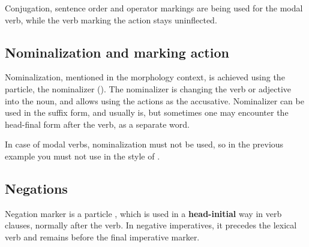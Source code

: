 Conjugation, sentence order and operator markings are being used for the modal
verb, while the verb marking the action stays uninflected.



\subsection{Nominalization and marking action}

Nominalization, mentioned in the morphology context, is achieved using the
 particle, the nominalizer (\Nmlz{}). The nominalizer is changing the
verb or adjective into the noun, and allows using the actions as the accusative.
Nominalizer can be used in the suffix form, and usually is, but sometimes one
may encounter the head-final form after the verb, as a separate word.



In case of modal verbs, nominalization must not be used, so in the previous
example  you must not use  in
the style of .

\subsection{Negations}

Negation marker is a particle , which is used in a
\textbf{head-initial} way in verb clauses, normally after the verb. In negative
imperatives, it precedes the lexical verb and remains before the final imperative
marker.



